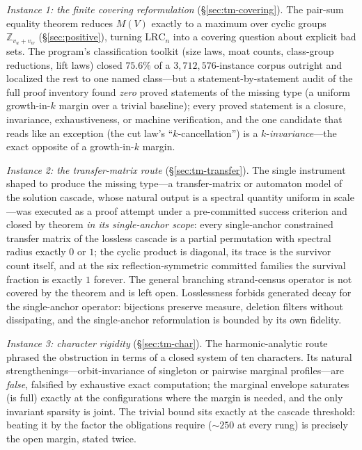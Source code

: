 \documentclass[11pt,a4paper]{article}
\numberwithin{equation}{section}
\theoremstyle{plain}
\theoremstyle{definition}
\theoremstyle{remark}
\newcommand{\Z}{\mathbb{Z}}
\newcommand{\lrc}{\mathrm{LRC}}
\begin{document}
\emph{Instance 1: the finite covering reformulation}
(\S\ref{sec:tm-covering}). The pair-sum equality theorem reduces
$M(V)$ exactly to a maximum over cyclic groups $\Z_{v_u+v_w}$
(\S\ref{sec:positive}), turning $\lrc_n$ into a covering question about
explicit bad sets. The program's classification toolkit (size laws, moat
counts, class-group reductions, lift laws) closed $75.6\%$ of a
$3{,}712{,}576$-instance corpus outright and localized the rest to one
named class---but a statement-by-statement audit of the full proof
inventory found \emph{zero} proved statements of the missing type (a
uniform growth-in-$k$ margin over a trivial baseline); every proved
statement is a closure, invariance, exhaustiveness, or machine
verification, and the one candidate that reads like an exception (the cut
law's ``$k$-cancellation'') is a $k$-\emph{invariance}---the exact
opposite of a growth-in-$k$ margin.

\emph{Instance 2: the transfer-matrix route} (\S\ref{sec:tm-transfer}).
The single instrument shaped to produce the missing type---a
transfer-matrix or automaton model of the solution cascade, whose natural
output is a spectral quantity uniform in scale---was executed as a proof
attempt under a pre-committed success criterion and closed by theorem
\emph{in its single-anchor scope}: every single-anchor constrained
transfer matrix of the lossless cascade is a partial
permutation with spectral radius exactly $0$ or $1$; the cyclic product is
diagonal, its trace is the survivor count itself, and at the six
reflection-symmetric committed families the survival fraction is exactly
$1$ forever. The general branching strand-census operator is not covered
by the theorem and is left open. Losslessness forbids generated decay
for the single-anchor operator: bijections preserve
measure, deletion filters without dissipating, and the single-anchor
reformulation is bounded by its own fidelity.

\emph{Instance 3: character rigidity} (\S\ref{sec:tm-char}). The
harmonic-analytic route phrased the obstruction in terms of a closed
system of ten characters. Its natural strengthenings---orbit-invariance
of singleton or pairwise marginal profiles---are \emph{false}, falsified
by exhaustive exact computation; the marginal envelope saturates (is
full) exactly at the configurations where the margin is needed, and the
only invariant sparsity is joint. The trivial bound sits exactly at the
cascade threshold: beating it by the factor the obligations require
($\sim\!250$ at every rung) is precisely the open margin, stated twice.
\end{document}
